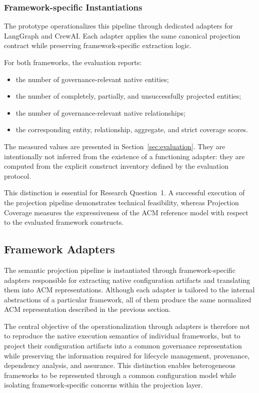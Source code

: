 \documentclass[10pt]{article}
\begin{document}
\subsubsection{Framework-specific Instantiations}

The prototype operationalizes this pipeline through dedicated adapters for
LangGraph and CrewAI. Each adapter applies the same canonical projection
contract while preserving framework-specific extraction logic.

For both frameworks, the evaluation reports:

\begin{itemize}
    \item the number of governance-relevant native entities;
    \item the number of completely, partially, and unsuccessfully projected
    entities;
    \item the number of governance-relevant native relationships;
    \item the corresponding entity, relationship, aggregate, and strict
    coverage scores.
\end{itemize}

The measured values are presented in
Section~\ref{sec:evaluation}. They are intentionally not inferred from the
existence of a functioning adapter: they are computed from the explicit
construct inventory defined by the evaluation protocol.

This distinction is essential for Research Question~1. A successful execution
of the projection pipeline demonstrates technical feasibility, whereas
Projection Coverage measures the expressiveness of the ACM reference model with
respect to the evaluated framework constructs.

\subsection{Framework Adapters}
\label{sec:framework_adapters}

The semantic projection pipeline is instantiated through framework-specific adapters responsible for extracting native configuration artifacts and translating them into ACM representations. Although each adapter is tailored to the internal abstractions of a particular framework, all of them produce the same normalized ACM representation described in the previous section.

The central objective of the operationalization through adapters is therefore not to reproduce the native execution semantics of individual frameworks, but to project their configuration artifacts into a common governance representation while preserving the information required for lifecycle management, provenance, dependency analysis, and assurance. This distinction enables heterogeneous frameworks to be represented through a common configuration model while isolating framework-specific concerns within the projection layer.
\end{document}
